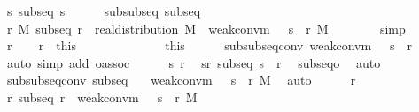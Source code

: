 \documentclass[leqno]{article}
\theoremstyle{definition}
\begin{document}
\begin{isabellebody}
\ s{\isacharcolon}\ {\isachardoublequoteopen}subseq\ s{\isachardoublequoteclose}\isanewline
\ \ \ \ \isamarkupfalse%
\ subsubseq\ subseq\ \isamarkupfalse%
\ {\isachardoublequoteopen}{\isasymexists}r\ M{\isachardot}\ subseq\ r\ {\isasymand}\ real{\isacharunderscore}distribution\ M\ {\isasymand}\ weak{\isacharunderscore}conv{\isacharunderscore}m\ {\isacharparenleft}{\isasymmu}\ {\isasymcirc}\ s\ {\isasymcirc}\ r{\isacharparenright}\ M{\isachardoublequoteclose}\isanewline
\ \ \ \ \ \ \isamarkupfalse%
\ simp\isanewline
\ \ \ \ \isamarkupfalse%
\ \isamarkupfalse%
\ r\ \isacommand{{\isachardot}{\isachardot}}\isamarkupfalse%
\ \isamarkupfalse%
\ r\ {\isacharequal}\ this\isanewline
\ \ \ \ \isamarkupfalse%
\ \isamarkupfalse%
\ {\isasymnu}\ \isacommand{{\isachardot}{\isachardot}}\isamarkupfalse%
\ \isamarkupfalse%
\ {\isasymnu}\ {\isacharequal}\ this\isanewline
\ \ \ \ \isamarkupfalse%
\ subsubseq{\isacharunderscore}conv{\isacharcolon}\ {\isachardoublequoteopen}weak{\isacharunderscore}conv{\isacharunderscore}m\ {\isacharparenleft}{\isasymmu}\ {\isasymcirc}\ {\isacharparenleft}s\ {\isasymcirc}\ r{\isacharparenright}{\isacharparenright}\ {\isasymnu}{\isachardoublequoteclose}\ \isamarkupfalse%
\ {\isacharparenleft}auto\ simp\ add{\isacharcolon}\ o{\isacharunderscore}assoc{\isacharparenright}\isanewline
\ \ \ \ \isamarkupfalse%
\ s\ r\ \isamarkupfalse%
\ sr{\isacharcolon}\ {\isachardoublequoteopen}subseq\ {\isacharparenleft}s\ {\isasymcirc}\ r{\isacharparenright}{\isachardoublequoteclose}\ \isamarkupfalse%
\ subseq{\isacharunderscore}o\ \isamarkupfalse%
\ auto\isanewline
\ \ \ \ \isamarkupfalse%
\ subsubseq{\isacharunderscore}conv\ subseq\ {\isasymnu}\ \isamarkupfalse%
\ {\isachardoublequoteopen}weak{\isacharunderscore}conv{\isacharunderscore}m\ {\isacharparenleft}{\isasymmu}\ {\isasymcirc}\ {\isacharparenleft}s\ {\isasymcirc}\ r{\isacharparenright}{\isacharparenright}\ M{\isachardoublequoteclose}\ \isamarkupfalse%
\ auto\isanewline
\ \ \ \ \isamarkupfalse%
\ r\ \isamarkupfalse%
\ {\isachardoublequoteopen}{\isasymexists}r{\isachardot}\ subseq\ r\ {\isasymand}\ weak{\isacharunderscore}conv{\isacharunderscore}m\ {\isacharparenleft}{\isasymmu}\ {\isasymcirc}\ {\isacharparenleft}s\ {\isasymcirc}\ r{\isacharparenright}{\isacharparenright}\ M{\isachardoublequoteclose}\ \isamarkupfalse%

\end{isabellebody}
\end{document}

